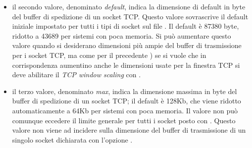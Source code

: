 \begin{basedescript}{\desclabelwidth{2.2cm}\desclabelstyle{\nextlinelabel}}
\begin{itemize}
  \item il secondo valore, denominato \textit{default}, indica la dimensione
    di default in byte del buffer di spedizione di un socket TCP.  Questo
    valore sovrascrive il default iniziale impostato per tutti i tipi di
    socket sul file . Il default è 87380
    byte, ridotto a 43689 per sistemi con poca memoria. Si può aumentare
    questo valore quando si desiderano dimensioni più ampie del buffer di
    trasmissione per i socket TCP, ma come per il precedente
    ) se si vuole che in corrispondenza
    aumentino anche le dimensioni usate per la finestra TCP si deve abilitare
    il \textit{TCP window scaling} con
    .

  \item il terzo valore, denominato \textit{max}, indica la dimensione massima
    in byte del buffer di spedizione di un socket TCP; il default è 128Kb, che
    viene ridotto automaticamente a 64Kb per sistemi con poca memoria. Il
    valore non può comunque eccedere il limite generale per tutti i socket
    posto con . Questo valore non viene
    ad incidere sulla dimensione del buffer di trasmissione di un singolo
    socket dichiarata con l'opzione .
  \end{itemize}

\end{basedescript}



